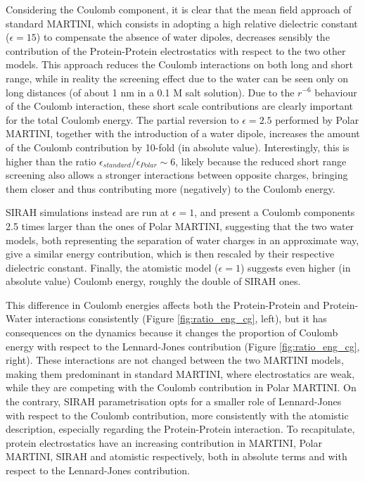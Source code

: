 Considering the Coulomb component, it is clear that the mean field approach of standard MARTINI, which consists in adopting a high relative dielectric constant ($\epsilon = 15$) to compensate the absence of water dipoles, decreases sensibly the contribution of the Protein-Protein electrostatics with respect to the two other models.
%
This approach reduces the Coulomb interactions on both long and short range, while in reality the screening effect due to the water can be seen only on long distances (of about 1 nm in a 0.1 M salt solution). Due to the $r^{-6}$ behaviour of the Coulomb interaction, these short scale contributions are clearly important for the total Coulomb energy.
%
The partial reversion to $\epsilon = 2.5$ performed by Polar MARTINI, together with the introduction of a water dipole, increases the amount of the Coulomb contribution by 10-fold (in absolute value).
%
Interestingly, this is higher than the ratio $\epsilon_{standard}/\epsilon_{Polar} \sim 6$, likely because the reduced short range screening also allows a stronger interactions between opposite charges, bringing them closer and thus contributing more (negatively) to the Coulomb energy.

SIRAH simulations instead are run at $\epsilon = 1$, and present a Coulomb components 2.5 times larger than the ones of Polar MARTINI, suggesting that the two water models, both representing the separation of water charges in an approximate way, give a similar energy contribution, which is then rescaled by their respective dielectric constant.
%
Finally, the atomistic model ($\epsilon = 1$) suggests even higher (in absolute value) Coulomb energy, roughly the double of SIRAH ones.


This difference in Coulomb energies affects both the Protein-Protein and Protein-Water interactions consistently (Figure \ref{fig:ratio_eng_cg}, left), but it has consequences on the dynamics because it changes the proportion of Coulomb energy with respect to the Lennard-Jones contribution (Figure \ref{fig:ratio_eng_cg}, right). These interactions are not changed between the two MARTINI models, making them predominant in standard MARTINI, where electrostatics are weak, while they are competing with the Coulomb contribution in Polar MARTINI.
%
On the contrary, SIRAH parametrisation opts for a smaller role of Lennard-Jones with respect to the Coulomb contribution, more consistently with the atomistic description, especially regarding the Protein-Protein interaction.
%
To recapitulate, protein electrostatics have an increasing contribution in MARTINI, Polar MARTINI, SIRAH and atomistic respectively, both in absolute terms and with respect to the Lennard-Jones contribution.

